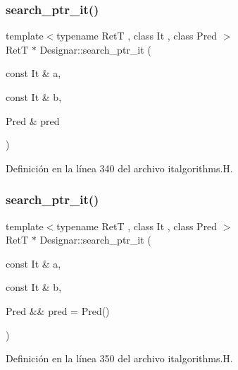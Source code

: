 \mbox{\label{namespace_designar_aaf2247479f4e93c88a4f6dd39267de5d}} 
\subsubsection{\texorpdfstring{search\+\_\+ptr\+\_\+it()}{search\_ptr\_it()}\hspace{0.1cm}{\footnotesize\ttfamily [1/2]}}
{\footnotesize\ttfamily template$<$typename RetT , class It , class Pred $>$ \\
RetT $\ast$ Designar\+::search\+\_\+ptr\+\_\+it (\begin{DoxyParamCaption}\item[{const It \&}]{a,  }\item[{const It \&}]{b,  }\item[{Pred \&}]{pred }\end{DoxyParamCaption})}



Definición en la línea 340 del archivo italgorithms.\+H.

\mbox{\label{namespace_designar_a6147a7cb2455406a69047efb700e5d50}} 
\subsubsection{\texorpdfstring{search\+\_\+ptr\+\_\+it()}{search\_ptr\_it()}\hspace{0.1cm}{\footnotesize\ttfamily [2/2]}}
{\footnotesize\ttfamily template$<$typename RetT , class It , class Pred $>$ \\
RetT $\ast$ Designar\+::search\+\_\+ptr\+\_\+it (\begin{DoxyParamCaption}\item[{const It \&}]{a,  }\item[{const It \&}]{b,  }\item[{Pred \&\&}]{pred = {\ttfamily Pred()} }\end{DoxyParamCaption})}



Definición en la línea 350 del archivo italgorithms.\+H.

\mbox{\label{namespace_designar_ac3674dae50d8d382e25a5fce8775294c}} 
